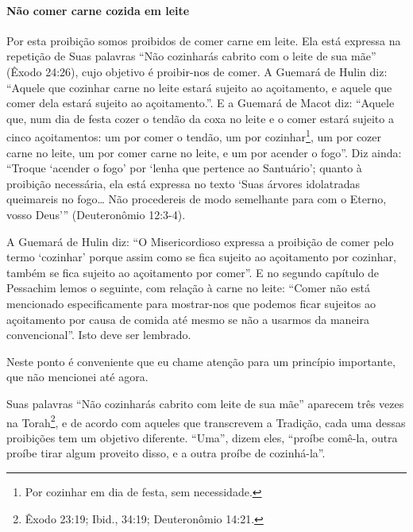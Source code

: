 \paragraph{Não comer carne cozida em leite}

Por esta proibição somos proibidos de comer carne em leite. Ela está
expressa na repetição de Suas palavras ``Não cozinharás cabrito com o
leite de sua mãe'' (Êxodo 24:26), cujo objetivo é proibir-nos de comer.
A Guemará de Hulin diz: ``Aquele que cozinhar carne no leite estará
sujeito ao açoitamento, e aquele que comer dela estará sujeito ao
açoitamento.''. E a Guemará de Macot diz: ``Aquele que, num dia de festa
cozer o tendão da coxa no leite e o comer estará sujeito a cinco
açoitamentos: um por comer o tendão, um por
cozinhar\footnote{Por cozinhar em dia de festa, sem necessidade.}, um por cozer carne no leite, um por
comer carne no leite, e um por acender o fogo''. Diz ainda: ``Troque
`acender o fogo' por `lenha que pertence ao Santuário'; quanto à
proibição necessária, ela está expressa no texto `Suas árvores
idolatradas queimareis no fogo\ldots{} Não procedereis de modo semelhante
para com o Eterno, vosso Deus''' (Deuteronômio 12:3-4).

A Guemará de Hulin diz: ``O Misericordioso expressa a proibição de comer
pelo termo `cozinhar' porque assim como se fica sujeito ao açoitamento
por cozinhar, também se fica sujeito ao açoitamento por comer''. E no
segundo capítulo de Pessachim lemos o seguinte, com relação à carne no
leite: ``Comer não está mencionado especificamente para mostrar-nos que
podemos ficar sujeitos ao açoitamento por causa de comida até mesmo se
não a usarmos da maneira convencional''. Isto deve ser lembrado.

Neste ponto é conveniente que eu chame atenção para um princípio
importante, que não mencionei até agora.

Suas palavras ``Não cozinharás cabrito com leite de sua mãe'' aparecem
três vezes na Torah\footnote{Êxodo 23:19; Ibid., 34:19; Deuteronômio 14:21.}, e de acordo com aqueles que
transcrevem a Tradição, cada uma dessas proibições tem um objetivo
diferente. ``Uma'', dizem eles, ``proíbe comê-la, outra proíbe tirar
algum proveito disso, e a outra proíbe de cozinhá-la''.

